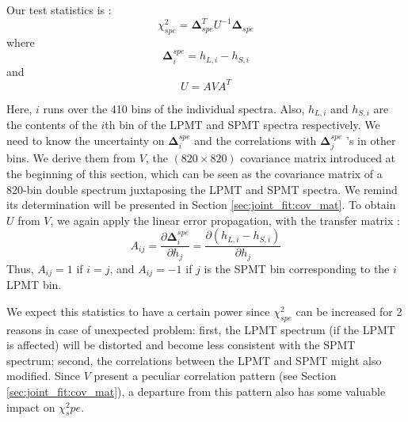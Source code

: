 \documentclass[../main.tex]{subfiles}
\begin{document}
Our test statistics is :
\begin{equation}
  \chi^2_{spe} = \bm{\Delta}_{spe}^T U^{-1} \bm{\Delta}_{spe}
\end{equation}
where
\begin{equation}
  \bm{\Delta}^{spe}_i = h_{L,i} - h_{S,i}
\end{equation}
and
\begin{equation}
  U = A V A^T
\end{equation}

Here, $i$ runs over the 410 bins of the individual spectra. Also, $h_{L,i}$ and $h_{S,i}$ are the contents of the $i$th bin of the LPMT and SPMT spectra respectively. We need to know the uncertainty on $\bm{\Delta}^{spe}_i$ and the correlations with $\bm{\Delta}^{spe}_j$ 's in other bins. We derive them from $V$, the $(820 \times 820)$ covariance matrix introduced at the beginning of this section, which can be seen as the covariance matrix of a 820-bin double spectrum juxtaposing the LPMT and SPMT spectra. We remind its determination will be presented in Section \ref{sec:joint_fit:cov_mat}. To obtain $U$ from $V$, we again apply the linear error propagation, with the transfer matrix :
\begin{equation}
  A_{ij} = \frac{\partial \bm{\Delta}^{spe}_i}{\partial h_j} = \frac{\partial(h_{L, i} - h_{S, i})}{\partial h_j}
\end{equation}
Thus, $A_{ij} = 1$ if $i = j$, and $A_{ij} = -1$ if $j$ is the SPMT bin corresponding to the $i$ LPMT bin.

We expect this statistics to have a certain power since $\chi^2_{spe}$ can be increased for 2 reasons in case of unexpected problem: first, the LPMT spectrum (if the LPMT is affected) will be distorted and become less consistent with the SPMT spectrum; second, the correlations between the LPMT and SPMT might also modified. Since $V$ present a peculiar correlation pattern (see Section \ref{sec:joint_fit:cov_mat}), a departure from this pattern also has some valuable impact on $\chi^2_spe$.


\end{document}
